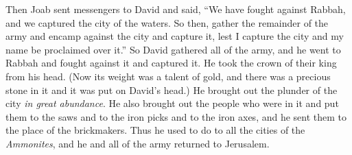 \begin{biblechapter}
\verse Then Joab sent messengers to David and said, “We have fought against Rabbah, and we captured the city of the waters.
\verse So then, gather the remainder of the army and encamp against the city and capture it, lest I capture the city and my name be proclaimed over it.”
\verse So David gathered all of the army, and he went to Rabbah and fought against it and captured it.
\verse He took the crown of their king from his head. (Now its weight was a talent of gold, and there was a precious stone in it and it was put on David’s head.) He brought out the plunder of the city \textit{in great abundance}.
\verse He also brought out the people who were in it and put them to the saws and to the iron picks and to the iron axes, and he sent them to the place of the brickmakers. Thus he used to do to all the cities of the \textit{Ammonites}, and he and all of the army returned to Jerusalem.
\end{biblechapter}

